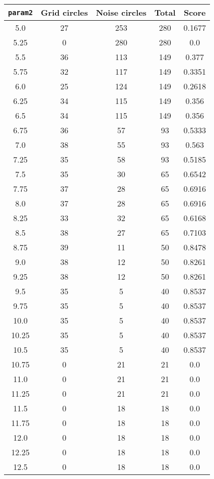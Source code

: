 \documentclass[letterpaper, 12pt]{article}
\begin{document}
\begin{longtable}{|c|c|c|c|c|}
\hline
\textbf{\texttt{param2}} & \textbf{Grid circles} & \textbf{Noise circles} & \textbf{Total} & \textbf{Score} \\
\hline
5.0 & 27 & 253 & 280 & 0.1677 \\
\hline
5.25 & 0 & 280 & 280 & 0.0 \\
\hline
5.5 & 36 & 113 & 149 & 0.377 \\
\hline
5.75 & 32 & 117 & 149 & 0.3351 \\
\hline
6.0 & 25 & 124 & 149 & 0.2618 \\
\hline
6.25 & 34 & 115 & 149 & 0.356 \\
\hline
6.5 & 34 & 115 & 149 & 0.356 \\
\hline
6.75 & 36 & 57 & 93 & 0.5333 \\
\hline
7.0 & 38 & 55 & 93 & 0.563 \\
\hline
7.25 & 35 & 58 & 93 & 0.5185 \\
\hline
7.5 & 35 & 30 & 65 & 0.6542 \\
\hline
7.75 & 37 & 28 & 65 & 0.6916 \\
\hline
8.0 & 37 & 28 & 65 & 0.6916 \\
\hline
8.25 & 33 & 32 & 65 & 0.6168 \\
\hline
8.5 & 38 & 27 & 65 & 0.7103 \\
\hline
8.75 & 39 & 11 & 50 & 0.8478 \\
\hline
9.0 & 38 & 12 & 50 & 0.8261 \\
\hline
9.25 & 38 & 12 & 50 & 0.8261 \\
\hline
9.5 & 35 & 5 & 40 & 0.8537 \\
\hline
9.75 & 35 & 5 & 40 & 0.8537 \\
\hline
10.0 & 35 & 5 & 40 & 0.8537 \\
\hline
10.25 & 35 & 5 & 40 & 0.8537 \\
\hline
10.5 & 35 & 5 & 40 & 0.8537 \\
\hline
10.75 & 0 & 21 & 21 & 0.0 \\
\hline
11.0 & 0 & 21 & 21 & 0.0 \\
\hline
11.25 & 0 & 21 & 21 & 0.0 \\
\hline
11.5 & 0 & 18 & 18 & 0.0 \\
\hline
11.75 & 0 & 18 & 18 & 0.0 \\
\hline
12.0 & 0 & 18 & 18 & 0.0 \\
\hline
12.25 & 0 & 18 & 18 & 0.0 \\
\hline
12.5 & 0 & 18 & 18 & 0.0 \\

\end{longtable}
\end{document}
